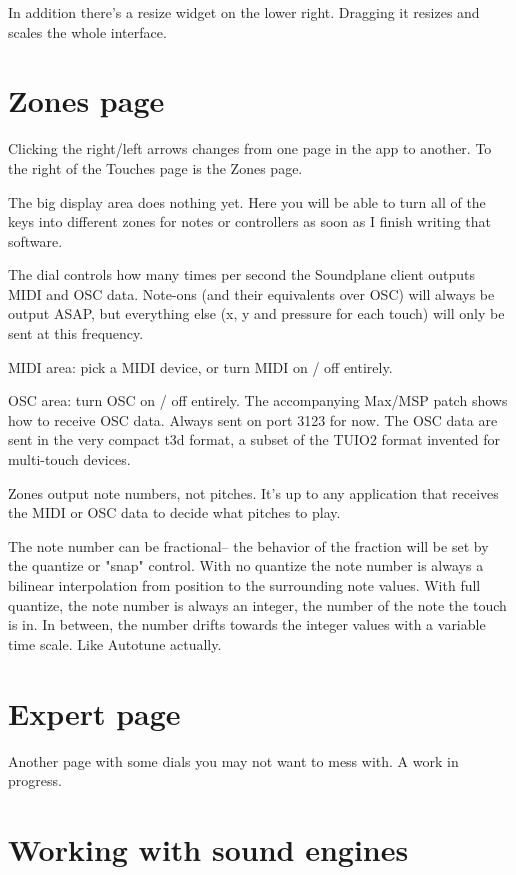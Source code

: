 In addition there's a resize widget on the lower right.  Dragging it resizes and scales the whole interface.  

\section{Zones page}

Clicking the right/left arrows changes from one page in the app to another.  To the right of the Touches page is the Zones page.  

The big display area does nothing yet. Here you will be able to turn all of the keys into different zones for notes or controllers as soon as I finish writing that software. 

The  dial controls how many times per second the Soundplane client outputs MIDI and OSC data.  Note-ons (and their equivalents over OSC) will always be output ASAP, but everything else (x, y and pressure for each touch) will only be sent at this frequency. 

MIDI area: pick a MIDI device, or turn MIDI on / off entirely.

OSC area: turn OSC on / off entirely.  The accompanying Max/MSP patch shows how to receive OSC data.  Always sent on port 3123 for now.  The OSC data are sent in the very compact t3d format, a subset of the TUIO2 format invented for multi-touch devices.  

Zones output note numbers, not pitches.  It's up to any application that receives the MIDI or OSC data to decide what pitches to play. 

The note number can be fractional-- the behavior of the fraction will be set by the quantize or "snap" control.  With no quantize the note number is always a bilinear interpolation from position to the surrounding note values.  With full quantize, the note number is always an integer, the number of the note the touch is in.  In between, the number drifts towards the integer values with a variable time scale.  Like Autotune actually.



\section{Expert page}

Another page with some dials you may not want to mess with. A work in progress. 


\section{Working with sound engines}


